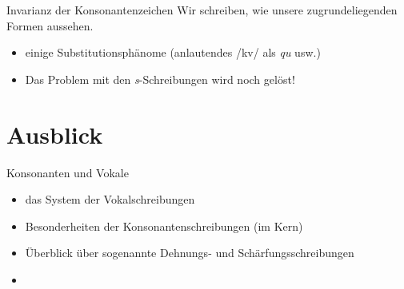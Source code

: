 \begin{frame}
  {Invarianz der Konsonantenzeichen}
  \pause
  \alert{Wir schreiben, wie unsere zugrundeliegenden Formen aussehen.}\\
  \pause
  \Zeile
  \centering
  \Zeile
  \pause
  \begin{itemize}[<+->]
    \item einige Substitutionsphänome (anlautendes /kv/ als \textit{qu} usw.)
    \item \alert{Das Problem mit den \textit{s}-Schreibungen wird noch gelöst!}
  \end{itemize}
\end{frame}


\section{Ausblick}


\begin{frame}
  {Konsonanten und Vokale}
  \onslide<+->
  \begin{itemize}[<+->]
  \item das System der \alert{Vokalschreibungen}
    \Halbzeile
    \item Besonderheiten der Konsonantenschreibungen (im Kern)
    \Halbzeile
    \item Überblick über sogenannte Dehnungs- und Schärfungsschreibungen
    \Zeile
    \item \citet[Kapitel~15]{Schaefer2018b}
  \end{itemize}
\end{frame}
